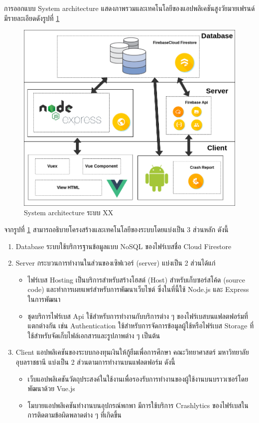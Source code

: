     การออกแบบ System architecture แสดงภาพรวมและเทคโนโลยีของแอปพลิเคชันสูงวัยมายเฟรนด์ มีรายละเอียดดังรูปที่ \ref{Fig:architecture}
   	\begin{figure}[H]
   		\centering
   		\includegraphics[width=\textwidth]{Figures/3/architecture/architecture}
   		\caption{System architecture ระบบ XX}
   		\label{Fig:architecture}
   	\end{figure}
   
   จากรูปที่ \ref{Fig:architecture} สามารถอธิบายโครงสร้างและเทคโนโลยีของระบบโดยแบ่งเป็น 3 ส่วนหลัก ดังนี้
   \begin{enumerate}
   	\item Database
   	 ระบบใช้บริการฐานข้อมูลแบบ NoSQL ของไฟร์เบสชื่อ Cloud Firestore
	  \item Server
	   กระบวนการทำงานในส่วนของเซิฟเวอร์ (server) แบ่งเป็น 2 ส่วนได้แก่
	   \begin{itemize}
	   	\item ไฟร์เบส Hosting เป็นบริการสำหรับสร้างโฮสต์ (Host) สำหรับเก็บซอร์สโค้ด (source code) และทำการเผยแพร่สำหรับการพัฒนาเว็บไซต์ ซึ่งในที่นี้ใช้ Node.js และ Express ในการพัฒนา
	   	\item ชุดบริการไฟร์เบส Api ใช้สำหรับการทำงานกับบริการต่าง ๆ ของไฟร์เบสบนแฟลตฟอร์มที่แตกต่างกัน เช่น Authentication ใช้สำหรับการจัดการข้อมูลผู้ใช้หรือไฟร์เบส Storage ที่ใช้สำหรับจัดเก็บไฟล์เอกสารและรูปภาพต่าง ๆ เป็นต้น
	   \end{itemize}
	   \item Client
	    แอปพลิเคชันของระบบกองทุนเงินให้กู้ยืมเพื่อการศึกษา คณะวิทยาศาสตร์ มหาวิทยาลัยอุบลราชธานี แบ่งเป็น 2 ส่วนตามการทำงานบนแฟลตฟอร์ม ดังนี้
	    \begin{itemize}
	    	\item เว็บแอปพลิเคชันวัตถุประสงค์ในใช้งานเพื่อรองรับการทำงานของผู้ใช้งานบนบราวเซอร์โดยพัฒนาด้วย Vue.js
	    	\item โมบายแอปพลิเคชันทำงานบนอุปกรณ์พกพา มีการใช้บริการ Crashlytics ของไฟร์เบสในการติดตามข้อผิดพลาดต่าง ๆ ที่เกิดขึ้น
	    \end{itemize}
   \end{enumerate}

